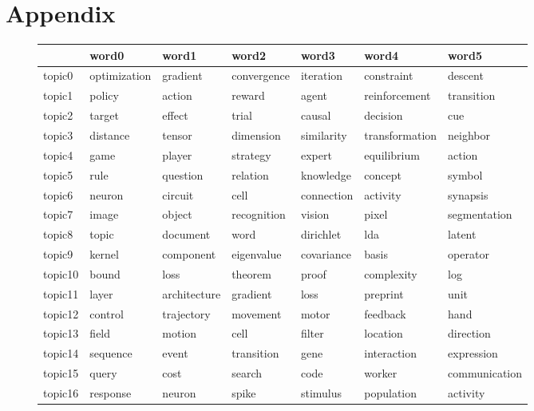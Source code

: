 \documentclass[letterpaper]{article}
\begin{document}


\onecolumn

\section{Appendix}
\label{sec:appendix}

\begin{figure}[ht]
  \centering
  \begin{tabular}{l | l l l l l l}
    &     word0    &      word1 &          word2 &         word3 & word4 &        word5 \\ \hline
    topic0 & optimization & gradient & convergence & iteration & constraint & descent \\
    topic1 & policy & action & reward & agent & reinforcement & transition \\
    topic2 & target & effect & trial & causal & decision & cue \\
    topic3 & distance & tensor & dimension & similarity & transformation & neighbor \\
    topic4 & game & player & strategy & expert & equilibrium & action \\
    topic5 & rule & question & relation & knowledge & concept & symbol \\
    topic6 & neuron & circuit & cell & connection & activity & synapsis \\
    topic7 & image & object & recognition & vision & pixel & segmentation \\
    topic8 & topic & document & word & dirichlet & lda & latent \\
    topic9 & kernel & component & eigenvalue & covariance & basis & operator \\
    topic10 & bound & loss & theorem & proof & complexity & log \\
    topic11 & layer & architecture & gradient & loss & preprint & unit \\
    topic12 & control & trajectory & movement & motor & feedback & hand \\
    topic13 & field & motion & cell & filter & location & direction \\
    topic14 & sequence & event & transition & gene & interaction & expression \\
    topic15 & query & cost & search & code & worker & communication \\
    topic16 & response & neuron & spike & stimulus & population & activity \\

\end{tabular}
\end{figure}
\end{document}
